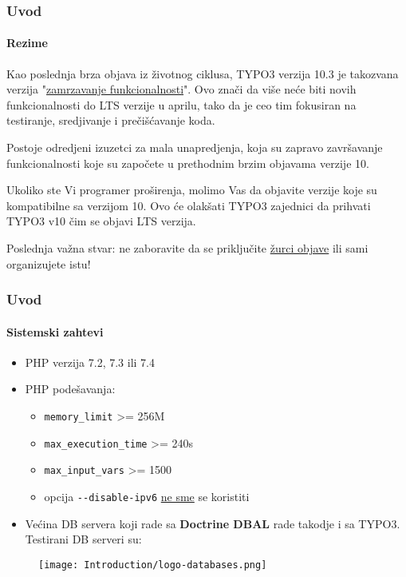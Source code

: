 \begin{frame}[fragile]
	\frametitle{Uvod}
	\framesubtitle{Rezime}

	\small
		Kao poslednja brza objava iz životnog ciklusa, TYPO3 verzija 10.3 je takozvana
		verzija "\href{https://typo3.org/article/land-ho-feature-freeze-ahead}{zamrzavanje funkcionalnosti}".
		Ovo znači da više neće biti novih funkcionalnosti do LTS verzije u aprilu,
		tako da je ceo tim fokusiran na testiranje, sredjivanje i prečišćavanje koda.

		\vspace{0.2cm}

		Postoje odredjeni izuzetci za mala unapredjenja, koja su zapravo završavanje funkcionalnosti
		koje su započete u prethodnim brzim objavama verzije 10.

		\vspace{0.2cm}

		Ukoliko ste Vi programer proširenja, molimo Vas da objavite verzije koje su kompatibilne sa
		verzijom 10. Ovo će olakšati TYPO3 zajednici da prihvati TYPO3 v10 čim se objavi LTS verzija.

		\vspace{0.2cm}

		Poslednja važna stvar: ne zaboravite da se priključite
		\href{https://typo3.org/community/events/v10-parties}{žurci objave}
		ili sami organizujete istu!

	\normalsize

\end{frame}


\begin{frame}[fragile]
	\frametitle{Uvod}
	\framesubtitle{Sistemski zahtevi}

	\begin{itemize}
		\item PHP verzija 7.2, 7.3 ili 7.4
		\item PHP podešavanja:

			\begin{itemize}
				\item \texttt{memory\_limit} >= 256M
				\item \texttt{max\_execution\_time} >= 240s
				\item \texttt{max\_input\_vars} >= 1500
				\item opcija \texttt{-}\texttt{-disable-ipv6} \underline{ne sme} se koristiti
			\end{itemize}

		\item Većina DB servera koji rade sa \textbf{Doctrine DBAL} rade takodje i sa TYPO3.
			Testirani DB serveri su:
	\end{itemize}

	\begin{figure}
		\texttt{[image: Introduction/logo-databases.png]}
	\end{figure}

\end{frame}

